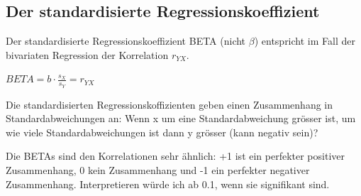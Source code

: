 \documentclass[
  10pt,
  letterpaper,
  a4paper, twoside]{scrreprt}
\begin{document}
\subsection{Der standardisierte
Regressionskoeffizient}\label{der-standardisierte-regressionskoeffizient}

Der standardisierte Regressionskoeffizient BETA (nicht \(\beta\))
entspricht im Fall der bivariaten Regression der Korrelation \(r_{YX}\).

\begin{tcolorbox}[enhanced jigsaw, coltitle=black, opacitybacktitle=0.6, toptitle=1mm, colbacktitle=quarto-callout-note-color!10!white, colback=white, toprule=.15mm, opacityback=0, bottomrule=.15mm, arc=.35mm, colframe=quarto-callout-note-color-frame, leftrule=.75mm, titlerule=0mm, breakable, left=2mm, rightrule=.15mm, title={Der standardisierte Regressionskoeffizient BETA aka b*}, bottomtitle=1mm]

\(BETA = b\cdot\frac{s_X}{s_Y} = r_{YX}\)

Die standardisierten Regressionskoffizienten geben einen Zusammenhang in
Standardabweichungen an: Wenn x um eine Standardabweichung grösser ist,
um wie viele Standardabweichungen ist dann y grösser (kann negativ
sein)?

Die BETAs sind den Korrelationen sehr ähnlich: +1 ist ein perfekter
positiver Zusammenhang, 0 kein Zusammenhang und -1 ein perfekter
negativer Zusammenhang. Interpretieren würde ich ab 0.1, wenn sie
signifikant sind.

\end{tcolorbox}
\end{document}
